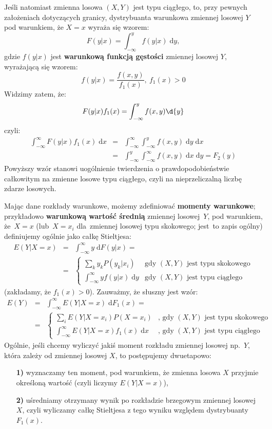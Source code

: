 \documentclass[10pt,a4paper]{article}
\newcommand{\dd}{\; \mathrm{d}}
\numberwithin{equation}{subsection}
\begin{document}
Jeśli natomiast zmienna losowa $(X,Y)$ jest typu ciągłego, to, przy pewnych
założeniach dotyczących granicy, dystrybuanta warunkowa zmiennej losowej $Y$
pod warunkiem, że $X=x$ wyraża się wzorem:
\begin{equation}
  F(y|x)=\int_{-\infty}^yf(y|x)\dd{y},
\end{equation}
gdzie $f(y|x)$ jest \textbf{warunkową funkcją gęstości} zmiennej losowej $Y$,
wyrażającą się wzorem:
\begin{equation}
  f(y|x) = \frac{f(x,y)}{f_1(x)},~f_1(x) > 0
\end{equation}
Widzimy zatem, że:
\[
  F(y|x)f_1(x) = \int_{-\infty}^y f(x,y)\d{y}
\]
czyli:
\begin{eqnarray}
  \nonumber
  \int_{-\infty}^{\infty} F(y|x) f_1(x) \dd{x} & = & \int_{-\infty}^{\infty} \int_{-\infty}^y f(x,y) \dd{y}\dd{x} \\
  \nonumber
  & = & \int_{-\infty}^y \int_{-\infty}^{\infty} f(x,y) \dd{x}\dd{y} = F_2(y)
\end{eqnarray}
Powyższy wzór stanowi uogólnienie twierdzenia o prawdopodobieństwie całkowitym
na zmienne losowe typu ciągłego, czyli na nieprzeliczalną liczbę zdarze
losowych.

Mając dane rozkłady warunkowe, możemy zdefiniować \textbf{momenty warunkowe};
przykładowo \textbf{warunkową wartość średnią} zmiennej losowej~$Y$,
pod warunkiem, że~$X=x$ (lub~$X=x_i$ dla~zmiennej losowej typu skokowego;
jest~to zapis ogólny) definiujemy ogólnie jako całkę Stieltjesa:
\begin{eqnarray}
  E(Y|X = x) &=& \int_{-\infty}^{\infty} y \dd{F(y|x)} = \\
  \nonumber
  &=& \begin{cases}
    \sum_ky_kP(y_k|x_i) & \textrm{gdy $(X,Y)$ jest typu skokowego} \\
    \int_{-\infty}^{\infty}yf(y|x)\dd{y} & \textrm{gdy $(X,Y)$ jest typu ciągłego}
  \end{cases}
\end{eqnarray}
(zakładamy, że $f_1(x)>0$). Zauważmy, że słuszny jest wzór:
\begin{eqnarray}
  E(Y) & = & \int_{-\infty}^{\infty}E(Y|X=x)\dd{F_1(x)} = \\
  \nonumber
  & = & \begin{cases}
    \sum_iE(Y|X=x_i)P(X=x_i) & \textrm{, gdy $(X,Y)$ jest typu skokowego} \\
    \int_{-\infty}^{\infty}E(Y|X=x)f_1(x)\dd{x} & \textrm{, gdy $(X,Y)$ jest typu ciągłego}
  \end{cases}
\end{eqnarray}
Ogólnie, jeśli chcemy wyliczyć jakiś moment rozkładu zmiennej losowej np.~$Y$,
która zależy od zmiennej losowej $X$, to postępujemy dwuetapowo:
\begin{enumerate}
  \item[\textbf{1)}] wyznaczamy ten moment, pod warunkiem, że zmienna losowa $X$
    przyjmie określoną wartość (czyli liczymy $E(Y|X = x)$),
  \item[\textbf{2)}] uśredniamy otrzymany wynik po rozkładzie brzegowym zmiennej
    losowej $X$, czyli wyliczamy całkę Stieltjesa z tego wyniku względem
    dystrybuanty $F_1(x)$.
\end{enumerate}
\end{document}
